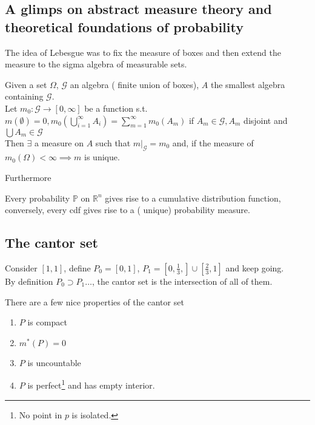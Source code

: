 \documentclass[../main.tex]{subfiles}
\begin{document}
\subsection{A glimps on abstract measure theory and theoretical foundations of probability}
The idea of Lebesgue was to fix the measure of boxes and then extend the measure to the sigma algebra of measurable sets.
\begin{thm}
	Given a set $\Omega$, $\mathcal{G}$ an algebra ( finite union of boxes), $A$ the smallest algebra containing $ \mathcal{G}$.\\
	Let $m_0: \mathcal{G}\to [ 0, \infty ] $ be a function s.t. $m( \emptyset) =0, m_0( \bigcup_{i=1}^{ \infty }A_i) = \sum_{m=1}^{ \infty } m_0( A_m) $ if $A_m \in \mathcal{G}, A_m$ disjoint and $ \bigcup A_m\in \mathcal{G}$ \\
	Then $\exists $ a measure on $A$ such that $m\vert_{ \mathcal{G}} = m_0$ and, if the measure of $m_0( \Omega) < \infty \implies m$ is unique.
\end{thm}
Furthermore
\begin{thm}
	Every probability $\mathbb{P}$ on $ \mathbb{R}^n$ gives rise to a cumulative distribution function, conversely, every cdf gives rise to a ( unique) probability measure.
\end{thm}
\subsection{The cantor set}
\begin{defn}
	Consider $ [ 1,1] $, define $P_0= [ 0,1] $, $P_1= [ 0,\frac{1}{3}, ] \cup [ \frac{2}{3},1] $ and keep going.\\
By definition $P_0 \supset P_1 \ldots$, the cantor set is the intersection of all of them.
\end{defn}
There are a few nice properties of the cantor set
\begin{thm}
\begin{enumerate}
\item $P$ is compact
\item $m^{*}( P) =0$ 
\item $P$ is uncountable
\item $P$ is perfect\footnote { No point in $p$ is isolated.}  and has empty interior.
\end{enumerate}

\end{thm}
\end{document}
